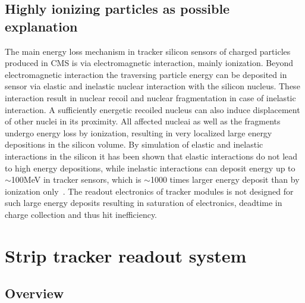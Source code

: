 



\subsection{Highly ionizing particles as possible explanation}

The main energy loss mechanism in tracker silicon sensors of charged particles produced in CMS is via electromagnetic interaction, mainly ionization. Beyond electromagnetic interaction the traversing particle energy can be deposited in sensor via elastic and inelastic nuclear interaction with the silicon nucleus. These interaction result in nuclear recoil and nuclear fragmentation in case of inelastic interaction. A sufficiently energetic recoiled nucleus can also induce displacement of other nuclei in its proximity. All affected nucleai as well as the fragments undergo energy loss by ionization, resulting in very localized large energy depositions in the silicon volume. By simulation of elastic and inelastic interactions in the silicon it has been shown that elastic interactions do not lead to high energy depositions, while inelastic interactions can deposit energy up to $\sim$100MeV in tracker sensors, which is $\sim$1000 times larger energy deposit than by ionization only~\cite{Huhtinen:2002yda}. The readout electronics of tracker modules is not designed for such large energy deposits resulting in saturation of electronics, deadtime in charge collection and thus hit inefficiency.

\section{Strip tracker readout system}

\subsection{Overview}

